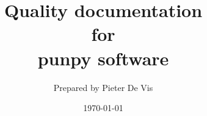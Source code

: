 
\def\Company{National Physical Laboratory}

\def\BoldTitle{Quality documentation}

\def\Subtitle{for \\ punpy software \\}
\def\Authors{Prepared by Pieter De Vis} 
\def\Shortname{P De Vis}


\title{\textbf{\BoldTitle}\\\Subtitle}
\author{\Authors}
\date{\today}

